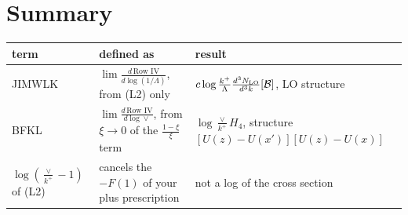 \documentclass[10pt]{article}
\numberwithin{equation}{section}
\newcommand{\NLO}[1]{\frac{d^3N_{#1}}{d^3k}}
\begin{document}
\section*{Summary}
\begin{center}\small
\begin{tabular}{@{}p{}p{}p{}@{}}\toprule
term & defined as & result\\\midrule
JIMWLK & $\lim\frac{d\,\text{Row IV}}{d\log(1/\Lambda)}$, from (L2) only & $c\log\frac{k^+}{\Lambda}\NLO{\rm LO}[\mathcal B]$, LO structure\\
BFKL & $\lim\frac{d\,\text{Row IV}}{d\log\vee}$, from $\xi\to0$ of the $\frac{1-\xi}{\xi}$ term & $\log\frac{\vee}{k^+}H_4$, structure $[U(z)-U(x')][U(z)-U(x)]$\\
$\log(\frac{\vee}{k^+}-1)$ of (L2) & cancels the $-F(1)$ of your plus prescription & not a log of the cross section\\\bottomrule
\end{tabular}
\end{center}
\end{document}
